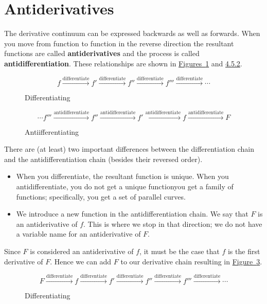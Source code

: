 \documentclass[12pt,]{book}
\newcommand{\terminology}[1]{\textbf{#1}}
\theoremstyle{plain}
\theoremstyle{definition}
\numberwithin{equation}{section}
\newcommand{\fd}[1]{#1'}
\newcommand{\sd}[1]{#1''}
\newcommand{\td}[1]{#1'''}
\begin{document}
\section[Antiderivatives]{Antiderivatives}\label{section-antiderivatives}
The derivative continuum can be expressed backwards as well as forwards.  When you move from function to function in the reverse direction the resultant functions are called \terminology{antiderivatives} and the process is called \terminology{antidifferentiation}.  These relationships are shown in \hyperref[figure-derivative-chain]{Figures~\ref*{figure-derivative-chain}} and \hyperref[figure-antiderivative-chain]{4.5.2}.%
\begin{figure}
\centering
\[f\xrightarrow{\text{differentiate}}\fd{f}\xrightarrow{\text{differentiate}}\sd{f}\xrightarrow{\text{differentiate}}\td{f}\xrightarrow{\text{differentiate}}\cdots\]%
\caption{Differentiating\label{figure-derivative-chain}}
\end{figure}
\begin{figure}
\centering
\[\cdots\td{f}\xrightarrow{\text{antidifferentiate}}\sd{f}\xrightarrow{\text{antidifferentiate}}\fd{f}\xrightarrow{\text{antidifferentiate}}f\xrightarrow{\text{antidifferentiate}}F\]%
\caption{Antiifferentiating\label{figure-antiderivative-chain}}
\end{figure}
\par
There are (at least) two important differences between the differentiation chain and the antidifferentiation chain (besides their reversed order).%
\begin{itemize}[label=\textbullet]
\item{}When you differentiate, the resultant function is unique. When you antidifferentiate, you do not get a unique function\textemdash{}you get a family of functions; specifically, you get a set of parallel curves.\item{}We introduce a new function in the antidifferentiation chain. We say that \(F\) is an antiderivative of \(f\).  This is where we stop in that direction; we do not have a variable name for an antiderivative of \(F\).\end{itemize}
\par
Since \(F\) is considered an antiderivative of \(f\), it must be the case that \(f\) is the first derivative of \(F\). Hence we can add \(F\) to our derivative chain resulting in \hyperref[figure-longer-derivative-chain]{Figure~\ref*{figure-longer-derivative-chain}}.%
\begin{figure}
\centering
\[F\xrightarrow{\text{differentiate}}f\xrightarrow{\text{differentiate}}\fd{f}\xrightarrow{\text{differentiate}}\sd{f}\xrightarrow{\text{differentiate}}\td{f}\xrightarrow{\text{differentiate}}\cdots\]%
\caption{Differentiating\label{figure-longer-derivative-chain}}
\end{figure}
\typeout{************************************************}
\typeout{************************************************}
\end{document}

